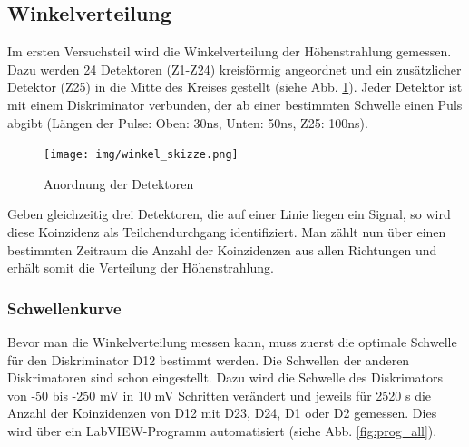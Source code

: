 \subsection{Winkelverteilung}

Im ersten Versuchsteil wird die Winkelverteilung der Höhenstrahlung gemessen. Dazu werden 24 Detektoren (Z1-Z24) kreisförmig angeordnet und ein zusätzlicher Detektor (Z25) in die Mitte des Kreises gestellt (siehe Abb. \ref{fig:winkel_skizze}). Jeder Detektor ist mit einem Diskriminator verbunden, der ab einer bestimmten Schwelle einen Puls abgibt (Längen der Pulse: Oben: 30ns, Unten: 50ns, Z25: 100ns).

\begin{figure}
\centering
\texttt{[image: img/winkel\_skizze.png]}
\caption{Anordnung der Detektoren\cite{praktikumsheft}}
\label{fig:winkel_skizze}
\end{figure}

Geben gleichzeitig drei Detektoren, die auf einer Linie liegen ein Signal, so wird diese Koinzidenz als Teilchendurchgang identifiziert. Man zählt nun über einen bestimmten Zeitraum die Anzahl der Koinzidenzen aus allen Richtungen und erhält somit die Verteilung der Höhenstrahlung.

\subsubsection{Schwellenkurve}
Bevor man die Winkelverteilung messen kann, muss zuerst die optimale Schwelle für den Diskriminator D12 bestimmt werden. Die Schwellen der anderen Diskrimatoren sind schon eingestellt. Dazu wird die Schwelle des Diskrimators von -50 bis -250 \si{\milli\volt} in 10 \si{\milli\volt} Schritten verändert und jeweils für 2520 \si{\second} die Anzahl der Koinzidenzen von D12 mit D23, D24, D1 oder D2 gemessen. Dies wird über ein LabVIEW-Programm automatisiert (siehe Abb. \ref{fig:prog_all}).\\

